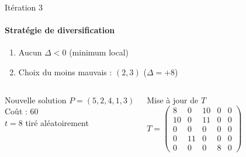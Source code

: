 \documentclass[10pt, handout]{beamer}
\begin{document}
\begin{frame}{Itération 3}
    \framesubtitle{Stratégie de diversification}


    \begin{enumerate}
        \item Aucun \( \Delta < 0 \) (minimum local)
        \item Choix du moins mauvais : \( (2,3) \) (\( \Delta = +8 \))
    \end{enumerate}

    \begin{columns}
        \begin{alertblock}{Nouvelle solution}
            \( P = (5, 2, 4, 1, 3) \) \\
            Coût : 60 \\
            \( t = 8 \) tiré aléatoirement
        \end{alertblock}

        \begin{exampleblock}{Mise à jour de \( T \)}
            \[
                T = \begin{pmatrix}
                    8  & 0  & 10 & 0 & 0 \\
                    10 & 0  & 11 & 0 & 0 \\
                    0  & 0  & 0  & 0 & 0 \\
                    0  & 11 & 0  & 0 & 0 \\
                    0  & 0  & 0  & 8 & 0
                \end{pmatrix}
            \]
        \end{exampleblock}
    \end{columns}
\end{frame}
\end{document}
